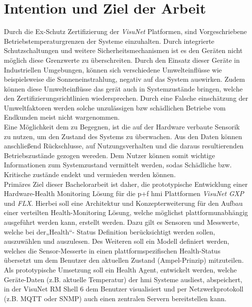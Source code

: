 \section{Intention und Ziel der Arbeit}\label{sec:IZA}
Durch die Ex-Schutz Zertifizierung der \textit{VisuNet} Platformen, sind Vorgeschriebene Betriebstemperaturgrenzen der Systeme einzuhalten. Durch integrierte Schutzschaltungen und weitere Sicherheitsmechanismen ist es den Geräten nicht möglich diese Grenzwerte zu überschreiten. Durch den Einsatz dieser Geräte in Industriellen Umgebungen, können sich verschiedene Umwelteinflüsse wie beispielsweise die Sonneneinstrahlung, negativ auf das System auswirken. Zudem können diese Umwelteinflüsse das gerät auch in Systemzustände bringen, welche den Zertifizierungsrichtlinien wiedersprechen. Durch eine Falsche einschätzung der Umweltfaktoren werden solche unzulässigen bzw schädlichen Betriebe vom Endkunden meist nicht wargenommen.\\
Eine Möglichkeit dem zu Begegnen, ist die auf  der Hardware verbaute Sensorik zu nutzen, um den Zustand des Systems zu überwachen. Aus den Daten können anschließend Rückschlusse, auf Nutzungsverhalten und die daraus resultierenden Betriebszustände gezogen wereden. Dem Nutzer können somit wichtige Informationen zum Systemzustand vermittelt werden, sodas Schädliche bzw. Kritische zustände endekt und vermieden werden können.\\
Primäres Ziel dieser Bachelorarbeit ist daher, die prototypische Entwicklung einer Hardware-Health Monitoring Lösung für die \acl{p+f} \ac{hmi} Plattformen \textit{VisuNet GXP} und \textit{FLX}. Hierbei soll eine Architektur und Konzepterweiterung für den Aufbau einer verteilten Health-Monitoring Lösung, welche möglichst plattformunabhängig ausgeführt werden kann, erstellt werden. Dazu gilt es Sensoren und Messwerte, welche bei der„Health“- Status Definition berücksichtigt werden sollen, auszuwählen und auszulesen. Des Weiteren soll ein Modell definiert werden, welches die Sensor-Messerte in einen plattformspezifischen Health-Status übersetzt um dem Benutzer den aktuellen Zustand (Ampel-Prinzip) mitzuteilen. Als prototypische Umsetzung soll ein Health Agent, entwickelt werden, welche Geräte-Daten (z.B. aktuelle Temperatur) der \ac{hmi} Systeme ausliest, abspeichert, in der VisuNet RM Shell 6 dem Benutzer visualisiert und per Netzwerkprotokoll (z.B. MQTT oder SNMP) auch einen zentralen Servern bereitstellen kann.    

